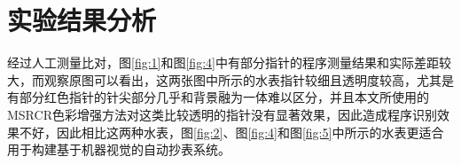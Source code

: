 \documentclass[a4paper]{ctexart}
\begin{document}
\section{实验结果分析}
经过人工测量比对，图\ref{fig:1}和图\ref{fig:4}中有部分指针的程序测量结果和实际差距较大，而观察原图可以看出，这两张图中所示的水表指针较细且透明度较高，尤其是有部分红色指针的针尖部分几乎和背景融为一体难以区分，并且本文所使用的MSRCR色彩增强方法对这类比较透明的指针没有显著效果，因此造成程序识别效果不好，因此相比这两种水表，图\ref{fig:2}、图\ref{fig:4}和图\ref{fig:5}中所示的水表更适合用于构建基于机器视觉的自动抄表系统。


\end{document}
